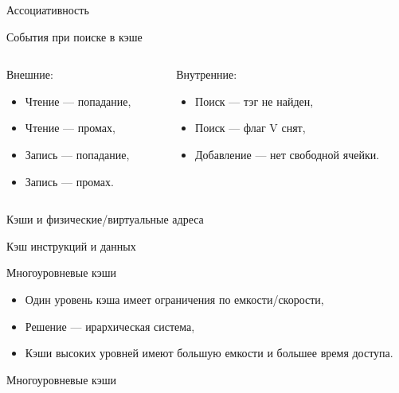 \begin{frame}{Ассоциативность}
\todo
\end{frame}

\begin{frame}{События при поиске в кэше}
\begin{columns}[t]
    \begin{column}[T]{0.5\textwidth}
    Внешние:
    \begin{itemize}
        \item Чтение --- попадание,
        \item Чтение --- промах,
        \item Запись --- попадание,
        \item Запись --- промах.
    \end{itemize}
    \end{column}
    \begin{column}[T]{0.5\textwidth}
    Внутренние:
    \begin{itemize}
        \item Поиск --- тэг не найден,
        \item Поиск --- флаг V снят,
        \item Добавление --- нет свободной ячейки.
    \end{itemize}
    \end{column}
\end{columns}
\end{frame}

\begin{frame}{Кэши и физические/виртуальные адреса}
\end{frame}

\begin{frame}{Кэш инструкций и данных}
\end{frame}

\begin{frame}{Многоуровневые кэши}
\begin{itemize}
    \item Один уровень кэша имеет ограничения по емкости/скорости,
    \item Решение --- ирархическая система,
    \item Кэши высоких уровней имеют большую емкости и большее время доступа.
\end{itemize}
\end{frame}

\begin{frame}{Многоуровневые кэши}
\end{frame}

